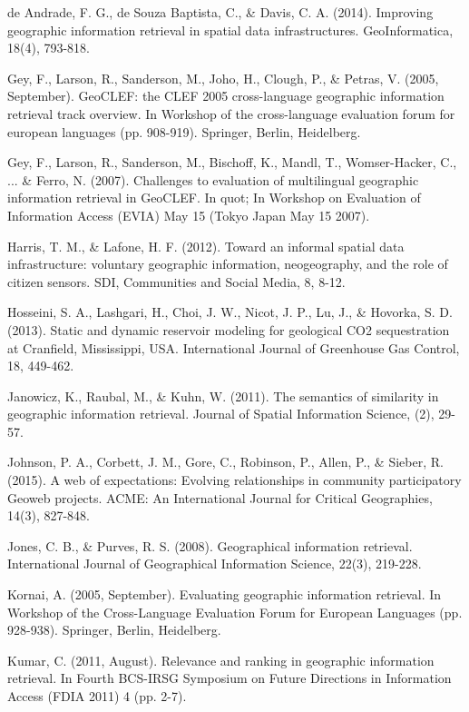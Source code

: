 \documentclass{llncs}
\begin{document}
\begin{thebibliography}{}
de Andrade, F. G., de Souza Baptista, C., \& Davis, C. A. (2014). Improving
geographic information retrieval in spatial data infrastructures.
GeoInformatica, 18(4), 793-818.

Gey, F., Larson, R., Sanderson, M., Joho, H., Clough, P., \& Petras, V.
(2005, September). GeoCLEF: the CLEF 2005 cross-language geographic information
retrieval track overview. In Workshop of the cross-language evaluation forum
for european languages (pp. 908-919). Springer, Berlin, Heidelberg.

Gey, F., Larson, R., Sanderson, M., Bischoff, K., Mandl, T., Womser-Hacker, C.,
... \& Ferro, N. (2007). Challenges to evaluation of multilingual geographic
information retrieval in GeoCLEF. In quot; In Workshop on Evaluation of
Information Access (EVIA) May 15 (Tokyo Japan May 15 2007).

Harris, T. M., \& Lafone, H. F. (2012). Toward an informal spatial data
infrastructure: voluntary geographic information, neogeography, and the role
of citizen sensors. SDI, Communities and Social Media, 8, 8-12.

Hosseini, S. A., Lashgari, H., Choi, J. W., Nicot, J. P., Lu, J., \& Hovorka,
S. D. (2013). Static and dynamic reservoir modeling for geological CO2
sequestration at Cranfield, Mississippi, USA. International Journal of
Greenhouse Gas Control, 18, 449-462.

Janowicz, K., Raubal, M., \& Kuhn, W. (2011). The semantics of similarity in
geographic information retrieval. Journal of Spatial Information Science, (2),
29-57.

Johnson, P. A., Corbett, J. M., Gore, C., Robinson, P., Allen, P., \& Sieber,
R. (2015). A web of expectations: Evolving relationships in community
participatory Geoweb projects. ACME: An International Journal for Critical
Geographies, 14(3), 827-848.

Jones, C. B., \& Purves, R. S. (2008). Geographical information retrieval.
International Journal of Geographical Information Science, 22(3), 219-228.

Kornai, A. (2005, September). Evaluating geographic information retrieval. In
Workshop of the Cross-Language Evaluation Forum for European Languages (pp.
928-938). Springer, Berlin, Heidelberg.

Kumar, C. (2011, August). Relevance and ranking in geographic information
retrieval. In Fourth BCS-IRSG Symposium on Future Directions in Information
Access (FDIA 2011) 4 (pp. 2-7).


\end{thebibliography}
\end{document}
